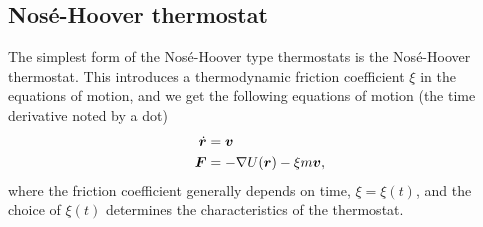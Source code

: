 


\subsection{Nosé-Hoover thermostat}
The simplest form of the Nosé-Hoover type thermostats is the Nosé-Hoover thermostat. This introduces a thermodynamic friction coefficient $\xi$ in the equations of motion, and we get the following equations of motion (the time derivative noted by a dot)
\begin{align}
    \dot {\boldsymbol{r}} &= \boldsymbol{v} \label{eq:nose_hoover_velocity}\\
    \boldsymbol{F} &= -\nabla U(\boldsymbol{r}) - \xi m \boldsymbol{v}, \label{eq:nose_hoover_force}
\end{align}
where the friction coefficient generally depends on time, $\xi = \xi(t)$, and the choice of $\xi(t)$ determines the characteristics of the thermostat. 

